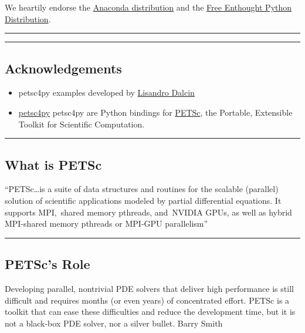 \documentclass{article}
\begin{document}
We heartily endorse the
\href{https://store.continuum.io/cshop/anaconda}{Anaconda distribution}
and the \href{http://www.enthought.com/products/epd_free.php}{Free
Enthought Python Distribution}.

    \begin{center}\rule{3in}{0.4pt}\end{center}

    \begin{center}\rule{3in}{0.4pt}\end{center}

\subsection{Acknowledgements}\label{acknowledgements}

\begin{itemize}
\itemsep1pt\parskip0pt
\item
  petsc4py examples developed by
  \href{http://www.bu.edu/pasi/people/lisandro-dalcin/}{Lisandro Dalcin}
\item
  \href{http://code.google.com/p/petsc4py/}{petsc4py} petsc4py are
  Python bindings for \href{http://www.mcs.anl.gov/petsc/}{PETSc}, the
  Portable, Extensible Toolkit for Scientific Computation.
\end{itemize}

    \begin{center}\rule{3in}{0.4pt}\end{center}

\subsection{What is PETSc}\label{what-is-petsc}

``PETSc\ldots{}is a suite of data structures and routines for the
scalable (parallel) solution of scientific applications modeled by
partial differential equations. It supports MPI,~shared memory pthreads,
and~NVIDIA GPUs, as well as hybrid MPI-shared memory pthreads or MPI-GPU
parallelism''

    \begin{center}\rule{3in}{0.4pt}\end{center}

\subsection{PETSc's Role}\label{petscs-role}

Developing parallel, nontrivial PDE solvers that deliver high
performance is still difficult and requires months (or even years) of
concentrated effort. PETSc is a toolkit that can ease these difficulties
and reduce the development time, but it is not a black-box PDE solver,
nor a silver bullet. Barry Smith
\end{document}
